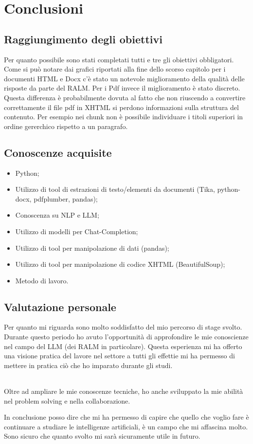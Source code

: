 \chapter{Conclusioni}
\label{cap:conclusioni}

\section{Raggiungimento degli obiettivi}
Per quanto possibile sono stati completati tutti e tre gli obiettivi obbligatori.
Come si può notare dai grafici riportati alla fine dello scorso capitolo per i documenti HTML e Docx c'è stato un notevole miglioramento della qualità delle risposte da parte del RALM.
Per i Pdf invece il miglioramento è stato discreto.
Questa differenza è probabilmente dovuta al fatto che non riuscendo a convertire correttamente il file pdf in XHTML si perdono informazioni sulla struttura del contenuto.
Per esempio nei chunk non è possibile individuare i titoli superiori in ordine gererchico rispetto a un paragrafo.

\section{Conoscenze acquisite}
\begin{itemize}
    \item Python;
    \item Utilizzo di tool di estrazioni di testo/elementi da documenti (Tika, python-docx, pdfplumber, pandas);
    \item Conoscenza su NLP e LLM;
    \item Utilizzo di modelli per Chat-Completion;
    \item Utilizzo di tool per manipolazione di dati (pandas);
    \item Utilizzo di tool per manipolazione di codice XHTML (BeautifulSoup);
    \item Metodo di lavoro.
\end{itemize}

\section{Valutazione personale}
Per quanto mi riguarda sono molto soddisfatto del mio percorso di stage svolto.
Durante questo periodo ho avuto l'opportunità di approfondire le mie conoscienze nel campo del LLM (dei RALM in particolare).
Questa esperienza mi ha offerto una visione pratica del lavore nel settore a tutti gli effettie mi ha permesso di mettere in pratica ciò che ho imparato durante gli studi.

\\
Oltre ad ampliare le mie conoscenze tecniche, ho anche sviluppato la mie abilità nel problem solving e nella collaborazione.

In conclusione posso dire che mi ha permesso di capire che quello che voglio fare è continuare a studiare le intelligenze artificiali, è un campo che mi affascina molto.
Sono sicuro che quanto svolto mi sarà sicuramente utile in futuro.

